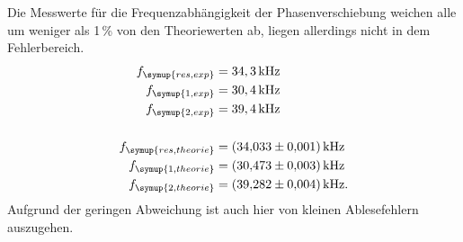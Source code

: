 Die Messwerte für die Frequenzabhängigkeit der Phasenverschiebung weichen alle um weniger als 1\,\% von den Theoriewerten ab, liegen 
allerdings nicht in dem Fehlerbereich.
\begin{align*}
    f_{\symup{res, exp}} &= 34,3\,\unit{\kilo\hertz} \\
    f_{\symup{1,exp}} &= 30,4\,\unit{\kilo\hertz} \\
    f_{\symup{2,exp}} &= 39,4\,\unit{\kilo\hertz} \\ \\
    f_{\symup{res, theorie}} &= \qty{34.033+-0.001}{\kilo\hertz} \\
    f_{\symup{1,theorie}} &= \qty{30.473+-0.003}{\kilo\hertz} \\
    f_{\symup{2,theorie}} &= \qty{39.282+-0.004}{\kilo\hertz}.
\end{align*}
Aufgrund der geringen Abweichung ist auch hier von kleinen Ablesefehlern auszugehen.
